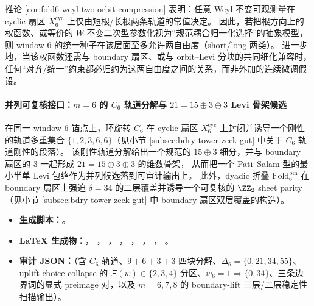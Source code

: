 \begin{remark}\label{rem:fold6-weyl-two-orbit-two-dof}
推论 \ref{cor:fold6-weyl-two-orbit-compression} 表明：任意 Weyl-不变可观测量在 cyclic 扇区 \(X^{\mathrm{cyc}}_6\) 上仅由短根/长根两条轨道的常值决定。
因此，若把根方向上的权函数、或等价的 \(W\)-不变二次型参数化视为“规范耦合归一化选择”的抽象模型，
则 window-\(6\) 的统一种子在该层面至多允许两自由度（short/long 两类）。
进一步地，当该权函数还需与 boundary 扇区、或与 orbit--Levi 分块的共同细化兼容时，
任何“对齐/统一”约束都必归约为这两自由度之间的关系，而非外加的连续微调假设。
\end{remark}

\paragraph{并列可复核接口：\(m=6\) 的 \texorpdfstring{$C_6$}{C6} 轨道分解与 \texorpdfstring{$21=15\oplus 3\oplus 3$}{21=15+3+3} Levi 骨架候选}
在同一 window-6 锚点上，环旋转 \(C_6\) 在 cyclic 扇区 \(X_6^{\mathrm{cyc}}\) 上封闭并诱导一个刚性的轨道多重集合 \(\{1,2,3,6,6\}\)（见小节 \ref{subsec:bdry-tower-zeck-gut} 中关于 \texorpdfstring{$C_6$}{C6} 轨道刚性的段落）。
该刚性轨道分解给出一个规范的 \(15\oplus 3\) 细分，并与 boundary 扇区的 \(3\) 一起形成 \(21=15\oplus 3\oplus 3\) 的维数骨架，
从而把一个 Pati--Salam 型的最小半单 Levi 包络作为并列候选落到可审计输出上。
此外，dyadic 折叠 \(\mathrm{Fold}^{\mathrm{bin}}_6\) 在 boundary 扇区上强迫 \(\delta=34\) 的二层覆盖并诱导一个可复核的 \(\ZZ_2\) sheet parity（见小节 \ref{subsec:bdry-tower-zeck-gut} 中 boundary 扇区双层覆盖的构造）。
\begin{itemize}
  \item \textbf{生成脚本：}\texttt{}。
  \item \textbf{LaTeX 生成物：}\texttt{}，
  \texttt{}，
  \texttt{}，
  \texttt{}，
  \texttt{}，
  \texttt{}，
  \texttt{}，
  \texttt{}。
  \item \textbf{审计 JSON：}\texttt{}（含 \(C_6\) 轨道、\(9+6+3+3\) 四块分解、\(\Delta_6=\{0,21,34,55\}\)、uplift-choice collapse 的 \(\Xi(w)\in\{2,3,4\}\) 分区、\(w_6=1\Rightarrow\{0,34\}\)、三条边界词的显式 preimage 对，以及 \(m=6,7,8\) 的 boundary-lift 三层/二层稳定性扫描输出）。
\end{itemize}

